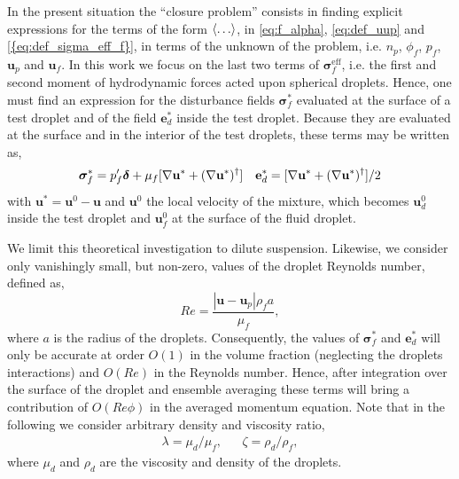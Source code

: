 In the present situation the ``closure problem'' consists in finding explicit expressions for the terms of the form $\left<\ldots\right>$, in \ref{eq:f_alpha}, \ref{eq:def_uup} and \ref{{eq:def_sigma_eff_f}}, in terms of the unknown of the problem, i.e. $n_p$, $\phi_f$, $p_f$, $\textbf{u}_p$ and $\textbf{u}_f$. 
In this work we focus on the last two terms of $\bm\sigma^\text{eff}_f$, i.e. the first and second moment of hydrodynamic forces acted upon spherical droplets.
Hence, one must find an expression for the disturbance fields $\bm\sigma_f^*$ evaluated at the surface of a test droplet and of the field $\textbf{e}_d^*$ inside the test droplet. 
Because they are evaluated at the surface and in the interior of the test droplets, these terms may be written as, 
\begin{align}
    \bm\sigma_f^* =p_f' \bm\delta 
    + \mu_f [\mathbf{\nabla} \textbf{u}^* + (\mathbf{\nabla} \textbf{u}^*)^\dagger]
    && 
    \textbf{e}_d^* = [\mathbf{\nabla} \textbf{u}^* + (\mathbf{\nabla} \textbf{u}^*)^\dagger] /2
\end{align}
with $\textbf{u}^* = \textbf{u}^0 - \textbf{u}$ and $\textbf{u}^0$ the local velocity of the mixture, which becomes $\textbf{u}_d^0$ inside the test droplet and $\textbf{u}_f^0$ at the surface of the fluid droplet. 

We limit this theoretical investigation to dilute suspension. 
Likewise, we consider only vanishingly small, but non-zero, values of the droplet Reynolds number, defined as,
\begin{equation}
    Re  = \frac{|\textbf{u} - \textbf{u}_p|\rho_f a}{\mu_f}, 
\end{equation}
where $a$ is the radius of the droplets. 
Consequently, the values of $\bm\sigma_f^*$ and $\textbf{e}_d^*$ will only be accurate at order $O(1)$ in the volume fraction (neglecting the droplets interactions) and $O(Re)$ in the Reynolds number. 
Hence, after integration over the surface of the droplet and ensemble averaging these terms will bring a contribution of $O(Re \phi)$ in the averaged momentum equation. 
Note that in the following we consider arbitrary density and viscosity ratio,
\begin{align}
    \lambda = \mu_d/\mu_f,  && \zeta =\rho_d /\rho_f,
\end{align}
where $\mu_d$ and $\rho_d$ are the viscosity and density of the droplets.

